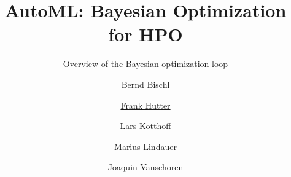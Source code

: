 %  


%

\usepackage[export]{adjustbox}
\usepackage{pgfpages}

\title[AutoML: Bayesian Optimization for HPO]{AutoML: Bayesian Optimization for HPO} %
\subtitle{Overview of the Bayesian optimization loop} %
\author[Marius Lindauer]{Bernd Bischl \and \underline{Frank Hutter} \and Lars Kotthoff\newline \and Marius Lindauer \and Joaquin Vanschoren}
\institute{}
\date{}



	
	\maketitle
	
    
    
    
    
    
    
    
    


